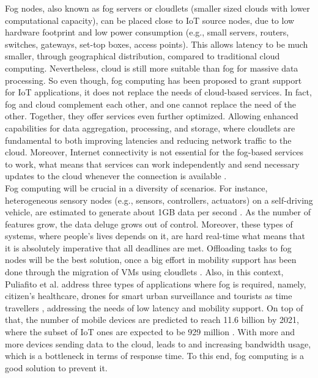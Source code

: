 Fog nodes, also known as fog servers or cloudlets (smaller sized clouds with lower computational capacity), can be placed close to IoT source nodes, due to low hardware footprint and low power consumption (e.g., small servers, routers, switches, gateways, set-top boxes, access points). This allows latency to be much smaller, through geographical distribution, compared to traditional cloud computing. Nevertheless, cloud is still more suitable than fog for massive data processing. So even though, fog computing has been proposed to grant support for IoT applications, it does not replace the needs of cloud-based services. In fact, fog and cloud complement each other, and one cannot replace the need of the other.
Together, they offer services even further optimized. Allowing enhanced capabilities for data aggregation, processing, and storage, where cloudlets are fundamental to both improving latencies and reducing network traffic to the cloud. Moreover, Internet connectivity is not essential for the fog-based services to work, what means that services can work independently and send necessary updates to the cloud whenever the connection is available \cite{yousefpour2018all}.\\
\noindent\tab Fog computing will be crucial in a diversity of scenarios. For instance, heterogeneous sensory nodes (e.g., sensors, controllers, actuators) on a self-driving vehicle, are estimated to generate about 1GB data per second \cite{angelica2013google}. As the number of features grow, the data deluge grows out of control. Moreover, these types of systems, where people's lives depends on it, are hard real-time what means that it is absolutely imperative that all deadlines are met. Offloading tasks to fog nodes will be the best solution, once a big effort in mobility support has been done through the migration of VMs using cloudlets \cite{lopes2017myifogsim}. Also, in this context, Puliafito et al. address three types of applications where fog is required, namely, citizen's healthcare, drones for smart urban surveillance and tourists as time travellers \cite{puliafito2017fog}, addressing the needs of low latency and mobility support. On top of that, the number of mobile devices are predicted to reach 11.6 billion by 2021, where the subset of IoT ones are expected to be 929 million \cite{cisco_2017}. With more and more devices sending data to the cloud, leads to and increasing bandwidth usage, which is a bottleneck in terms of response time. To this end, fog computing is a good solution to prevent it.\\
